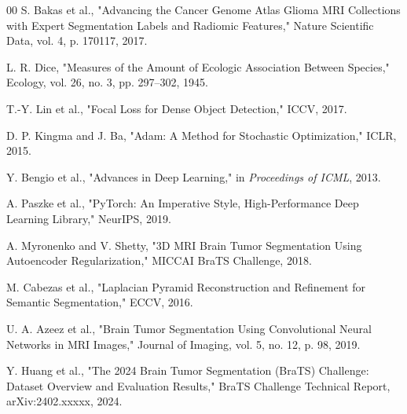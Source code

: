 \documentclass[conference]{IEEEtran}
\begin{document}
\begin{thebibliography}{00}
S. Bakas et al.,
"Advancing the Cancer Genome Atlas Glioma MRI Collections with Expert Segmentation Labels and Radiomic Features,"
Nature Scientific Data, vol. 4, p. 170117, 2017.

L. R. Dice,
"Measures of the Amount of Ecologic Association Between Species,"
Ecology, vol. 26, no. 3, pp. 297--302, 1945.

T.-Y. Lin et al.,
"Focal Loss for Dense Object Detection,"
ICCV, 2017.

D. P. Kingma and J. Ba,
"Adam: A Method for Stochastic Optimization,"
ICLR, 2015.

Y. Bengio et al.,
"Advances in Deep Learning," in
\textit{Proceedings of ICML}, 2013.

A. Paszke et al.,
"PyTorch: An Imperative Style, High-Performance Deep Learning Library,"
NeurIPS, 2019.

A. Myronenko and V. Shetty,
"3D MRI Brain Tumor Segmentation Using Autoencoder Regularization,"
MICCAI BraTS Challenge, 2018.

M. Cabezas et al.,
"Laplacian Pyramid Reconstruction and Refinement for Semantic Segmentation,"
ECCV, 2016.

U. A. Azeez et al.,
"Brain Tumor Segmentation Using Convolutional Neural Networks in MRI Images,"
Journal of Imaging, vol. 5, no. 12, p. 98, 2019.

Y. Huang et al.,
"The 2024 Brain Tumor Segmentation (BraTS) Challenge: Dataset Overview and Evaluation Results,"
BraTS Challenge Technical Report, arXiv:2402.xxxxx, 2024.

\end{thebibliography}
\end{document}
